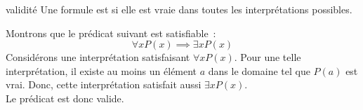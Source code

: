\begin{definition}{}{validité}
    Une formule est  si elle est vraie dans toutes les interprétations possibles.
\end{definition}

\begin{exemple}{}{}
    Montrons que le prédicat suivant est satisfiable~:
    $$\forall x P(x) \implies \exists x P(x)$$
    Considérons une interprétation satisfaisant $\forall x P(x)$. Pour une telle interprétation, il existe au moins un élément $a$ dans le domaine tel que $P(a)$ est vrai. Donc, cette interprétation satisfait aussi $\exists x P(x)$.\\
    Le prédicat est donc valide.
\end{exemple}


